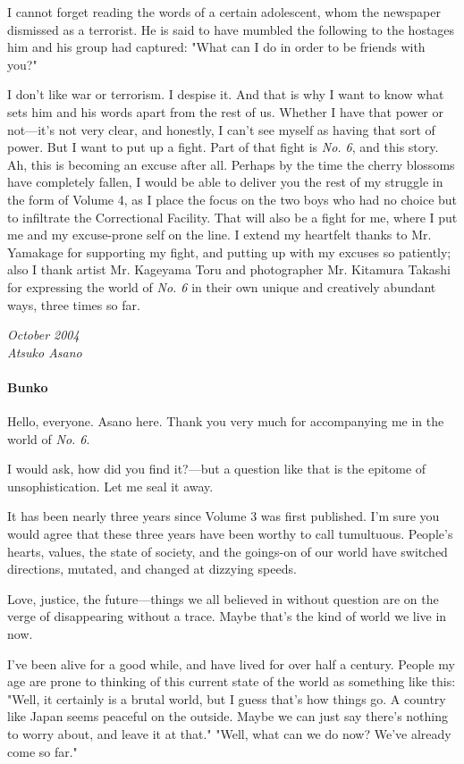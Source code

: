 I cannot forget reading the words of a certain adolescent, whom the
newspaper dismissed as a terrorist. He is said to have mumbled the
following to the hostages him and his group had captured: "What can I do
in order to be friends with you?"

I don't like war or terrorism. I despise it. And that is why I want to
know what sets him and his words apart from the rest of us. Whether I
have that power or not---it's not very clear, and honestly, I can't see
myself as having that sort of power. But I want to put up a fight. Part
of that fight is \emph{No. 6}, and this story. Ah, this is becoming an excuse
after all. Perhaps by the time the cherry blossoms have completely
fallen, I would be able to deliver you the rest of my struggle in the
form of Volume 4, as I place the focus on the two boys who had no choice
but to infiltrate the Correctional Facility. That will also be a fight
for me, where I put me and my excuse-prone self on the line. I extend my
heartfelt thanks to Mr. Yamakage for supporting my fight, and putting up
with my excuses so patiently; also I thank artist Mr. Kageyama Toru and
photographer Mr. Kitamura Takashi for expressing the world of \emph{No. 6} in
their own unique and creatively abundant ways, three times so far.

\myspace

\emph{October 2004\\
	Atsuko Asano}

\paragraph{Bunko}

Hello, everyone. Asano here. Thank you very much for accompanying me in
the world of \emph{No. 6}.

I would ask, how did you find it?---but a question like that is the
epitome of unsophistication. Let me seal it away.

It has been nearly three years since Volume 3 was first published. I'm
sure you would agree that these three years have been worthy to call
tumultuous. People's hearts, values, the state of society, and the
goings-on of our world have switched directions, mutated, and changed at
dizzying speeds.

Love, justice, the future---things we all believed in without question are
on the verge of disappearing without a trace. Maybe that's the kind of
world we live in now.

I've been alive for a good while, and have lived for over half a
century. People my age are prone to thinking of this current state of
the world as something like this: "Well, it certainly is a brutal world,
but I guess that's how things go. A country like Japan seems peaceful on
the outside. Maybe we can just say there's nothing to worry about, and
leave it at that." "Well, what can we do now? We've already come so
far."


